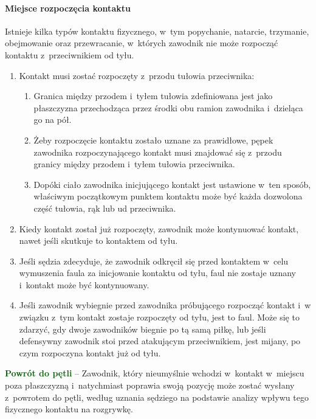 \documentclass[12pt]{article}
\newcommand\other[1]{\bgroup\textcolor{darkgreen}{\textbf{#1}}}
\begin{document}
\paragraph{Miejsce rozpoczęcia kontaktu}
Istnieje kilka typów
kontaktu fizycznego, w~tym popychanie, natarcie, trzymanie, obejmowanie
oraz przewracanie, w~których zawodnik nie może rozpocząć kontaktu z~przeciwnikiem od tyłu.

\begin{enumerate}
	\item
	      Kontakt musi zostać rozpoczęty z~przodu tułowia przeciwnika:

	      \begin{enumerate}
		      \item
		            Granica między przodem i~tyłem tułowia zdefiniowana jest jako
		            płaszczyzna przechodząca przez środki obu ramion zawodnika i~dzieląca go na pół.
		      \item
		            Żeby rozpoczęcie kontaktu zostało uznane za prawidłowe, pępek
		            zawodnika rozpoczynającego kontakt musi znajdować się z~przodu
		            granicy między przodem i~tyłem tułowia przeciwnika.
		      \item
		            Dopóki ciało zawodnika inicjującego kontakt jest ustawione w~ten
		            sposób, właściwym początkowym punktem kontaktu może być każda
		            dozwolona część tułowia, rąk lub ud przeciwnika.
	      \end{enumerate}
	\item
	      Kiedy kontakt został już rozpoczęty, zawodnik może kontynuować
	      kontakt, nawet jeśli skutkuje to kontaktem od tyłu.
	\item
	      Jeśli sędzia zdecyduje, że zawodnik odkręcił się przed kontaktem w~celu wymuszenia faula za inicjowanie kontaktu od tyłu, faul nie
	      zostaje uznany i~kontakt może być kontynuowany.
	\item
	      Jeśli zawodnik wybiegnie przed zawodnika próbującego rozpocząć kontakt
	      i~w związku z~tym kontakt zostaje rozpoczęty od tyłu, jest to faul.
	      Może się to zdarzyć, gdy dwoje zawodników biegnie po tą samą piłkę,
	      lub jeśli defensywny zawodnik stoi przed atakującym przeciwnikiem,
	      jest mijany, po czym rozpoczyna kontakt już od tyłu.
\end{enumerate}

\other{Powrót do pętli} -- Zawodnik, który nieumyślnie wchodzi w~kontakt w~miejscu poza płaszczyzną i~natychmiast poprawia swoją pozycję może
zostać wysłany z~powrotem do pętli, według uznania sędziego na podstawie
analizy wpływu tego fizycznego kontaktu na rozgrywkę.
\end{document}
